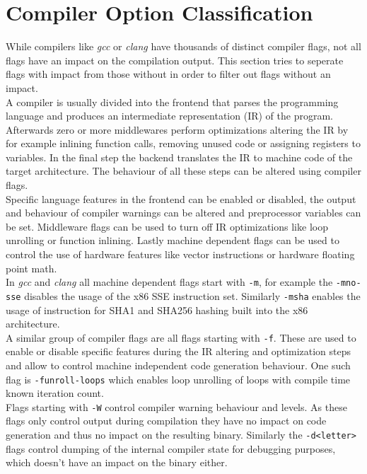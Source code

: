 \documentclass[9pt, a4paper, twocolumn]{article}
\begin{document}
\section{Compiler Option Classification} \label{sec:impact}
While compilers like \textit{gcc} or \textit{clang} have thousands of distinct compiler flags, not all flags have an impact on the compilation output. This section tries to seperate flags with impact from those without in order to filter out flags without an impact. \\
A compiler is usually divided into the frontend that parses the programming language and produces an intermediate representation (IR) of the program. Afterwards zero or more middlewares perform optimizations altering the IR by for example inlining function calls, removing unused code or assigning registers to variables. In the final step the backend translates the IR to machine code of the target architecture\cite{engineering-compiler}. The behaviour of all these steps can be altered using compiler flags. \\
Specific language features in the frontend can be enabled or disabled, the output and behaviour of compiler warnings can be altered and preprocessor variables can be set. Middleware flags can be used to turn off IR optimizations like loop unrolling or function inlining. Lastly machine dependent flags can be used to control the use of hardware features like vector instructions or hardware floating point math. \\
In \textit{gcc} and \textit{clang} all machine dependent flags start with \verb'-m'\cite{gcc-man, clang-man}, for example the \verb'-mno-sse' disables the usage of the x86 SSE instruction set. Similarly \verb'-msha' enables the usage of instruction for SHA1 and SHA256 hashing built into the x86 architecture. \\
A similar group of compiler flags are all flags starting with \verb'-f'. These are used to enable or disable specific features during the IR altering and optimization steps and allow to control machine independent code generation behaviour\cite{gcc-man, clang-man}. One such flag is \verb'-funroll-loops' which enables loop unrolling of loops with compile time known iteration count. \\
Flags starting with \verb'-W' control compiler warning behaviour and levels. As these flags only control output during compilation they have no impact on code generation and thus no impact on the resulting binary. Similarly the \verb'-d<letter>' flags control dumping of the internal compiler state for debugging purposes, which doesn't have an impact on the binary either. \\
\end{document}
